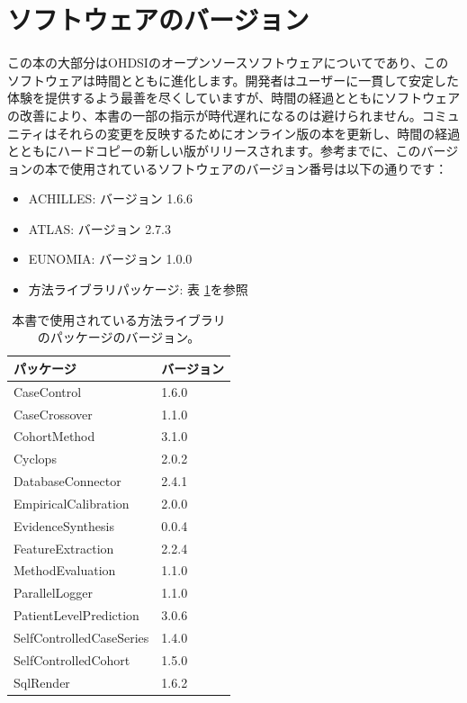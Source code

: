 \documentclass[
  11pt]{book}
\providecommand{\tightlist}{%
  \setlength{\itemsep}{0pt}\setlength{\parskip}{0pt}}
\theoremstyle{definition}
\theoremstyle{definition}
\theoremstyle{definition}
\theoremstyle{definition}
\theoremstyle{remark}
\begin{document}
\section*{ソフトウェアのバージョン}\label{ux30bdux30d5ux30c8ux30a6ux30a7ux30a2ux306eux30d0ux30fcux30b8ux30e7ux30f3}

この本の大部分はOHDSIのオープンソースソフトウェアについてであり、このソフトウェアは時間とともに進化します。開発者はユーザーに一貫して安定した体験を提供するよう最善を尽くしていますが、時間の経過とともにソフトウェアの改善により、本書の一部の指示が時代遅れになるのは避けられません。コミュニティはそれらの変更を反映するためにオンライン版の本を更新し、時間の経過とともにハードコピーの新しい版がリリースされます。参考までに、このバージョンの本で使用されているソフトウェアのバージョン番号は以下の通りです：

\begin{itemize}
\tightlist
\item
  ACHILLES: バージョン 1.6.6
\item
  ATLAS: バージョン 2.7.3
\item
  EUNOMIA: バージョン 1.0.0
\item
  方法ライブラリパッケージ: 表 \ref{tab:packageVersions}を参照
\end{itemize}

\begin{table}

\caption{\label{tab:packageVersions}本書で使用されている方法ライブラリのパッケージのバージョン。}
\centering
\begin{tabular}[t]{ll}
\toprule
パッケージ & バージョン\\
\midrule
CaseControl & 1.6.0\\
CaseCrossover & 1.1.0\\
CohortMethod & 3.1.0\\
Cyclops & 2.0.2\\
DatabaseConnector & 2.4.1\\
\addlinespace
EmpiricalCalibration & 2.0.0\\
EvidenceSynthesis & 0.0.4\\
FeatureExtraction & 2.2.4\\
MethodEvaluation & 1.1.0\\
ParallelLogger & 1.1.0\\
\addlinespace
PatientLevelPrediction & 3.0.6\\
SelfControlledCaseSeries & 1.4.0\\
SelfControlledCohort & 1.5.0\\
SqlRender & 1.6.2\\
\bottomrule
\end{tabular}
\end{table}
\end{document}
